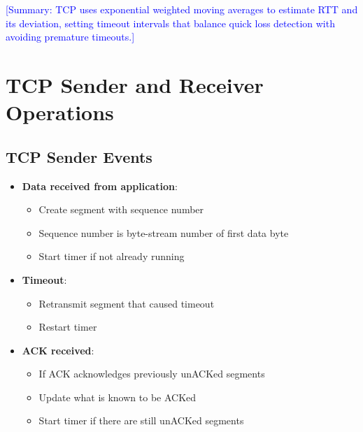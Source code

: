 \documentclass[12pt]{article}
\begin{document}
\textcolor{blue}{[Summary: TCP uses exponential weighted moving averages to estimate RTT and its deviation, setting timeout intervals that balance quick loss detection with avoiding premature timeouts.]}

\section{TCP Sender and Receiver Operations}

\subsection{TCP Sender Events}
\begin{itemize}
    \item \textbf{Data received from application}:
          \begin{itemize}
              \item Create segment with sequence number
              \item Sequence number is byte-stream number of first data byte
              \item Start timer if not already running
          \end{itemize}
    \item \textbf{Timeout}:
          \begin{itemize}
              \item Retransmit segment that caused timeout
              \item Restart timer
          \end{itemize}
    \item \textbf{ACK received}:
          \begin{itemize}
              \item If ACK acknowledges previously unACKed segments
              \item Update what is known to be ACKed
              \item Start timer if there are still unACKed segments
          \end{itemize}
\end{itemize}
\end{document}
